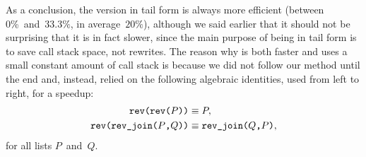As a conclusion, the version in tail form is always more efficient
(between 0\%~and~\(33.3\%\), in average~\(20\%\)), although we said
earlier that it should not be surprising that it is in fact slower,
since the main purpose of being in tail form is to save call stack
space, not rewrites. The reason why  is both
faster and uses a small constant amount of call stack is because we
did not follow our method until the end and, instead, relied on the
following algebraic identities, used from left to right, for a
speedup:
\begin{align*}
\texttt{rev(rev(\(P\)))} &\mathrel{\equiv} P,\\
\texttt{rev(rev\_join(\(P\),\(Q\)))} 
                          &\mathrel{\equiv} \texttt{rev\_join(\(Q\),\(P\))},
\end{align*}
for all lists \(P\)~and~\(Q\).


